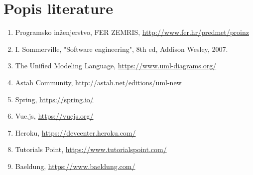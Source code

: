 \chapter*{Popis literature}
	 	
		\begin{enumerate}
			
			
			\item  Programsko inženjerstvo, FER ZEMRIS, \url{http://www.fer.hr/predmet/proinz}
			
			\item  I. Sommerville, "Software engineering", 8th ed, Addison Wesley, 2007.
			
			\item  The Unified Modeling Language, \url{https://www.uml-diagrams.org/}
			
			\item  Astah Community, \url{http://astah.net/editions/uml-new}
			
			\item Spring, \url{https://spring.io/}
			
			\item Vue.js, \url{https://vuejs.org/}
			
			\item Heroku, \url{https://devcenter.heroku.com/}
			
			\item Tutorials Point, \url{https://www.tutorialspoint.com/}
			
			\item Baeldung, \url{https://www.baeldung.com/}
		\end{enumerate}
		
		 